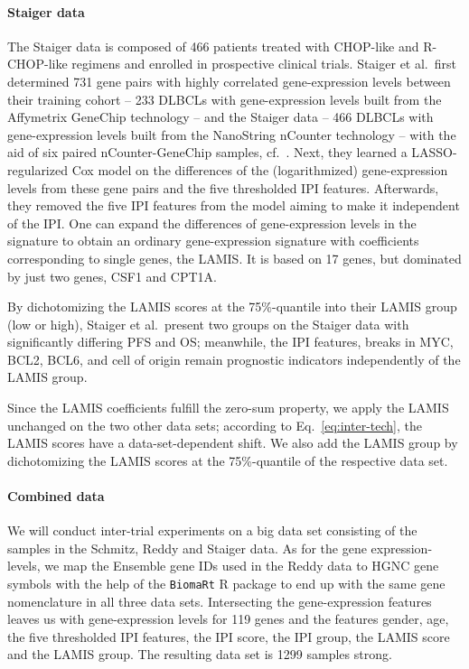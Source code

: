 \paragraph{Staiger data}

The Staiger data is composed of \num{466} patients treated with CHOP-like and R-CHOP-like regimens 
and enrolled in prospective clinical trials. 
Staiger et al.\ first determined \num{731} gene pairs with highly correlated gene-expression levels 
between their training cohort -- \num{233} DLBCLs with gene-expression levels built from the Affymetrix 
GeneChip technology -- and the Staiger data -- \num{466} DLBCLs with gene-expression levels built 
from the NanoString nCounter technology -- with the aid of six paired nCounter-GeneChip samples, cf.\ 
\cite[Supplementary Methods]{staiger20}.
Next, they learned a LASSO-regularized Cox model on the differences of the (logarithmized) 
gene-expression levels from these gene pairs and the five thresholded IPI features.
Afterwards, they removed the five IPI features from the model aiming to make it independent of the 
IPI. One can expand the differences of gene-expression levels in the signature to obtain an ordinary 
gene-expression signature with coefficients corresponding to single genes, the LAMIS. It is 
based on \num{17} genes, but dominated by just two genes, CSF1 and CPT1A. 

By dichotomizing the 
LAMIS scores at the 75\%-quantile into their LAMIS group (low or high), Staiger et al.\ present two 
groups on the Staiger data with significantly differing PFS and OS; 
meanwhile, the IPI features, breaks in MYC, BCL2, BCL6, and cell of origin remain prognostic 
indicators independently of the LAMIS group.

Since the LAMIS coefficients fulfill the 
zero-sum property, we apply the LAMIS unchanged on the two other data sets; according to Eq.\ 
\eqref{eq:inter-tech}, the LAMIS scores have a data-set-dependent shift. We also add the LAMIS 
group by dichotomizing the LAMIS scores at the 75\%-quantile of the respective data set.

\paragraph{Combined data}

We will conduct inter-trial experiments on a big data set consisting of the samples in the Schmitz, 
Reddy and Staiger data. As for the gene expression-levels, we map the Ensemble gene IDs used 
in the Reddy data to HGNC gene symbols with the help of the \texttt{BiomaRt} R package 
\cite{biomart09}
to end up with the same gene nomenclature in all three data sets. Intersecting the gene-expression 
features leaves us with gene-expression levels for \num{119} genes and the features gender, age, 
the five thresholded IPI features, the IPI score, the IPI group, the LAMIS score and the LAMIS 
group. The resulting data set is \num{1299} samples strong.

